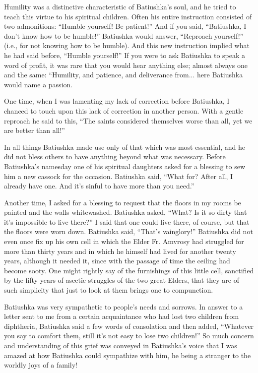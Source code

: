 Humility was a distinctive characteristic of Batiushka's soul, and he tried to teach this virtue to his spiritual children. Often his entire instruction consisted of two admonitions: ``Humble yourself! Be patient!'' And if you said, ``Batiushka, I don't know how to be humble!'' Batiushka would answer, ``Reproach yourself!'' (i.e., for not knowing how to be humble). And this new instruction implied what he had said before, ``Humble yourself!'' If you were to ask Batiushka to speak a word of profit, it was rare that you would hear anything else; almost always one and the same: ``Humility, and patience, and deliverance from... here Batiushka would name a passion.

One time, when I was lamenting my lack of correction before Batiushka, I chanced to touch upon this lack of correction in another person. With a gentle reproach he said to this, ``The saints considered themselves worse than all, yet we are better than all!''

In all things Batiushka made use only of that which was most essential, and he did not bless others to have anything beyond what was necessary. Before Batiushka's namesday one of his spiritual daughters asked for a blessing to sew him a new cassock for the occasion. Batiushka said, ``What for? After all, I already have one. And it's sinful to have more than you need.''

Another time, I asked for a blessing to request that the floors in my rooms be painted and the walls whitewashed. Batiushka asked, ``What? Is it so dirty that it's impossible to live there?'' I said that one could live there, of course, but that the floors were worn down. Batiushka said, ``That’s vainglory!'' Batiushka did not even once fix up his own cell in which the Elder Fr. Amvrosy had struggled for more than thirty years and in which he himself had lived for another twenty years, although it needed it, since with the passage of time the ceiling had become sooty. One might rightly say of the furnishings of this little cell, sanctified by the fifty years of ascetic struggles of the two great Elders, that they are of such simplicity that just to look at them brings one to compunction.

Batiushka was very sympathetic to people's needs and sorrows. In answer to a letter sent to me from a certain acquaintance who had lost two children from diphtheria, Batiushka said a few words of consolation and then added, ``Whatever you say to comfort them, still it's not easy to lose two children!'' So much concern and understanding of this grief was conveyed in Batiushka's voice that I was amazed at how Batiushka could sympathize with him, he being a stranger to the worldly joys of a family!

